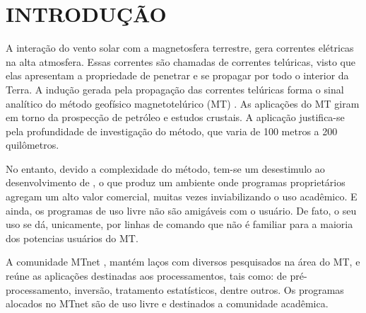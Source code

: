 \setcounter{page}{10}
\chapter{INTRODUÇÃO}
   


    
    
    A interação do vento solar com a magnetosfera terrestre, gera correntes elétricas na alta atmosfera. Essas correntes são chamadas de correntes telúricas, visto que elas apresentam a propriedade de penetrar e se propagar por todo o interior da Terra. A indução gerada pela propagação das correntes telúricas forma o sinal analítico do método geofísico magnetotelúrico (MT) \cite{parkinson93}. As aplicações do MT giram em torno da prospecção de petróleo e estudos crustais. A aplicação justifica-se pela profundidade de investigação do método, que varia de 100 metros a 200 quilômetros.

    
    No entanto, devido a complexidade do método, tem-se um desestimulo ao desenvolvimento de \softwares, o que produz um ambiente onde programas proprietários agregam um alto valor comercial, muitas vezes inviabilizando o uso acadêmico. E ainda, os programas de uso livre não são amigáveis com o usuário. De fato, o seu uso se dá, unicamente, por linhas de comando que não é familiar para a maioria dos potencias usuários do MT.

    A comunidade MTnet \cite{mtnet}, mantém laços com diversos pesquisados na área do MT, e reúne as aplicações destinadas aos processamentos, tais como:  de pré-processamento, inversão, tratamento estatísticos, dentre outros. Os programas alocados no MTnet são de uso livre e destinados a comunidade acadêmica. %
    
